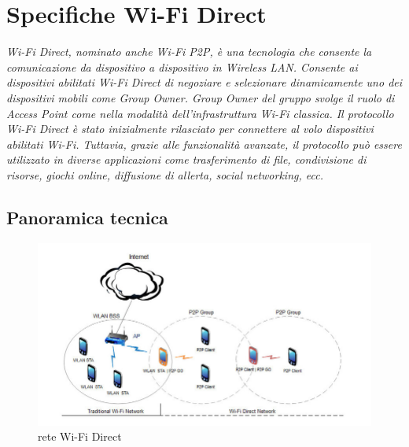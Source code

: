 \chapter{Specifiche Wi-Fi Direct}
\label{chap:basi}

\begin{minipage}{12cm}\textit{
Wi-Fi Direct, nominato anche Wi-Fi P2P, è una tecnologia
che consente la comunicazione da dispositivo a dispositivo in Wireless
LAN.
Consente ai dispositivi abilitati Wi-Fi Direct di negoziare e selezionare
dinamicamente
uno dei dispositivi mobili come Group Owner. Group Owner del gruppo
svolge
il ruolo di Access Point come nella modalità dell'infrastruttura Wi-Fi
classica. Il protocollo
Wi-Fi Direct è stato inizialmente rilasciato per connettere al volo dispositivi
abilitati Wi-Fi.
Tuttavia, grazie alle funzionalità avanzate, il protocollo può essere
utilizzato in diverse
applicazioni come trasferimento di file, condivisione di risorse, giochi
online, diffusione di
allerta, social networking, ecc.}
\end{minipage}

\vspace*{1cm}

\section{Panoramica tecnica}

\begin{figure}
\caption{rete Wi-Fi Direct}
\includegraphics[width=1\columnwidth]{imgs/wifip2pnet.jpg} %
\end{figure}

